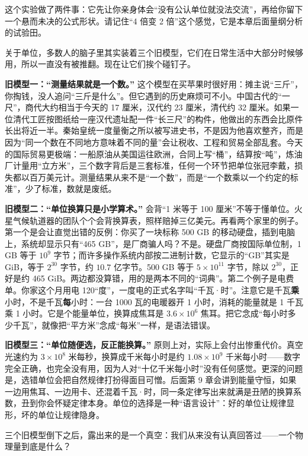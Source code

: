 这个实验做了两件事：它先让你亲身体会“没有公认单位就没法交流”，再给你留下一个悬而未决的公式形状。请记住“4 倍变 2 倍”这个感觉，它是本章后面量纲分析的试验田。


关于单位，多数人的脑子里其实装着三个旧模型，它们在日常生活中大部分时候够用，所以一直没有被推翻。现在让它们挨个碰钉子。

\textbf{旧模型一：“测量结果就是一个数。”} 这个模型在买苹果时很好用：摊主说“三斤”，你掏钱，没人追问“三斤是什么”。但它遇到的历史麻烦可不小。中国古代的“一尺”，商代大约相当于今天的 17 厘米，汉代约 23 厘米，清代约 32 厘米。如果一位清代工匠按图纸给一座汉代遗址配一件“长三尺”的构件，他做出的东西会比原件长出将近一半。秦始皇统一度量衡之所以被写进史书，不是因为他喜欢整齐，而是因为“同一个数在不同地方意味着不同的量”会让税收、工程和贸易全部乱套。今天的国际贸易更极端：一船原油从美国运往欧洲，合同上写“桶”，结算按“吨”，炼油厂计量用“立方米”，三个数字背后是三套标准，任何一个环节把单位张冠李戴，损失都以百万美元计。测量结果从来不是“一个数”，而是“一个数乘以一个约定的标准”，少了标准，数就是废纸。

\textbf{旧模型二：“单位换算只是小学算术。”} 会背“1 米等于 100 厘米”不等于懂单位。火星气候轨道器的团队个个会背换算表，照样赔掉三亿美元。再看两个家里的例子。第一个是会让直觉出错的反例：你买了一块标称 500 GB 的移动硬盘，插到电脑上，系统却显示只有“465 GB”，是厂商骗人吗？不是。硬盘厂商按国际单位制，1 GB 等于 $10^9$ 字节；而许多操作系统内部按二进制计数，它显示的“GB”其实是 GiB，等于 $2^{30}$ 字节，约 $10.7$ 亿字节。500 GB 等于 $5\times10^{11}$ 字节，除以 $2^{30}$，正好是约 465 GiB。两边都没算错，用的是两本不同的“词典”。第二个例子是电费单。你家这个月用电 120“度”，一度电的正式名字叫“千瓦·时”。注意它是千瓦\textbf{乘}小时，不是千瓦\textbf{每}小时：一台 1000 瓦的电暖器开 1 小时，消耗的能量就是 1 千瓦乘 1 小时。它是个能量单位，换算成焦耳是 $3.6\times10^6$ 焦耳。把它念成“每小时多少千瓦”，就像把“平方米”念成“每米”一样，是语法错误。

\textbf{旧模型三：“单位随便选，反正能换算。”} 原则上对，实际上会付出惨重代价。真空光速约为 $3\times10^8$ 米每秒，换算成千米每小时是约 $1.08\times10^9$ 千米每小时——数字完全正确，也完全没有用，因为人对“十亿千米每小时”没有任何感觉。更深的问题是，选错单位会把自然规律打扮得面目可憎。后面第 9 章会讲到能量守恒，如果一边用焦耳、一边用卡、还混着千瓦·时，同一条定律写出来就满是丑陋的换算系数，丑到你会怀疑定律本身。单位的选择是一种“语言设计”：好的单位让规律显形，坏的单位让规律隐身。

三个旧模型倒下之后，露出来的是一个真空：我们从来没有认真回答过——一个物理量到底是什么？

